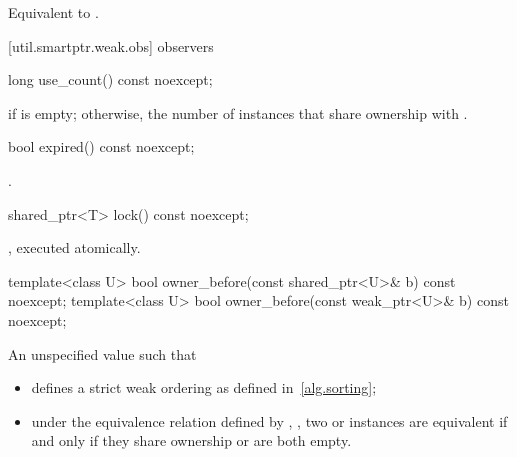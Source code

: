\begin{itemdescr}
\pnum\effects  Equivalent to .
\end{itemdescr}

[util.smartptr.weak.obs]{ observers}
%
\begin{itemdecl}
long use_count() const noexcept;
\end{itemdecl}

\begin{itemdescr}
\pnum\returns  {} if  is empty;
otherwise, the number of  instances
that share ownership with .
\end{itemdescr}

%
\begin{itemdecl}
bool expired() const noexcept;
\end{itemdecl}

\begin{itemdescr}
\pnum\returns  {}.
\end{itemdescr}

%
\begin{itemdecl}
shared_ptr<T> lock() const noexcept;
\end{itemdecl}

\begin{itemdescr}
\pnum
\returns {}, executed atomically.
\end{itemdescr}

%
\begin{itemdecl}
template<class U> bool owner_before(const shared_ptr<U>& b) const noexcept;
template<class U> bool owner_before(const weak_ptr<U>& b) const noexcept;
\end{itemdecl}

\begin{itemdescr}
\pnum
\returns An unspecified value such that

\begin{itemize}
\item {} defines a strict weak ordering as defined in~\ref{alg.sorting};

\item under the equivalence relation defined by ,
, two  or
 instances are equivalent if and only if they share ownership or are
both empty.
\end{itemize}
\end{itemdescr}


